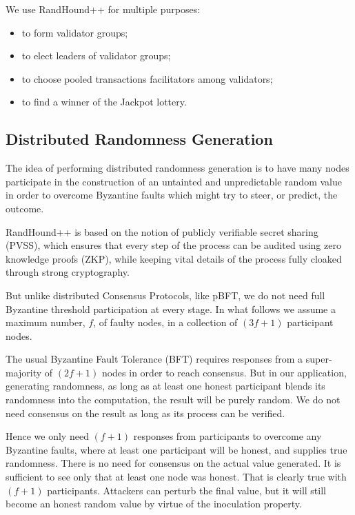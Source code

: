 \documentclass[a4paper, 10pt, conference]{ieeeconf}
\begin{document}
We use RandHound++ for multiple purposes:

\begin{itemize}
	\item {to form validator groups;}
	\item {to elect leaders of validator groups;} 
	\item {to choose pooled transactions facilitators among validators;}
	\item {to find a winner of the Jackpot lottery.}
\end{itemize}

\subsection{Distributed Randomness Generation}

The idea of performing distributed randomness generation is to have many nodes participate in the construction of an untainted and unpredictable random value in order to overcome Byzantine faults which might try to steer, or predict, the outcome.

RandHound++ is based on the notion of publicly verifiable secret sharing (PVSS)\cite{c15}, which ensures that every step of the process can be audited using zero knowledge proofs (ZKP), while keeping vital details of the process fully cloaked through strong cryptography.

But unlike distributed Consensus Protocols, like pBFT, we do not need full Byzantine threshold participation at every stage. In what follows we assume a maximum number, $f$, of faulty nodes, in a collection of $(3 f + 1)$ participant nodes. 

The usual Byzantine Fault Tolerance (BFT) requires responses from a super-majority of $(2 f + 1)$ nodes in order to reach consensus. But in our application, generating randomness, as long as at least one honest participant blends its randomness into the computation, the result will be purely random. We do not need consensus on the result as long as its process can be verified.

Hence we only need $(f + 1)$ responses from participants to overcome any Byzantine faults, where at least one participant will be honest, and supplies true randomness. There is no need for consensus on the actual value generated. It is sufficient to see only that at least one node was honest. That is clearly true with $(f + 1)$ participants. Attackers can perturb the final value, but it will still become an honest random value by virtue of the inoculation property.
\end{document}
